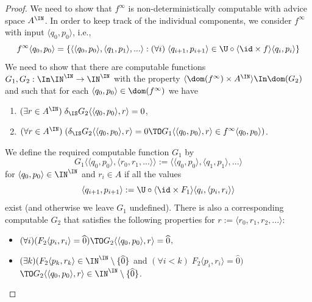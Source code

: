 \begin{proof}
We need to show that $f^\infty$ is non-deterministically computable with advice space $A^\IN$.
In order to keep track of the individual components, we consider $f^\infty$ with input $\langle q_0,p_0\rangle$, i.e.,
\[f^\infty\langle q_0,p_0\rangle=\{\langle\langle q_0,p_0\rangle,\langle q_1,p_1\rangle,...\rangle:
(\forall i)\;\langle q_{i+1},p_{i+1}\rangle\in\U\circ\langle\id\times f\rangle\langle q_i,p_i\rangle\}\]
We need to show that there are computable functions $G_1,G_2:\In\IN^\IN\to\IN^\IN$ 
with the property
$\langle \dom(f^\infty)\times A^\IN\rangle\In\dom(G_2)$ and such that for each $\langle q_0,p_0\rangle\in\dom(f^\infty)$ we have
\begin{enumerate}
\item $(\exists r\in A^\IN)\;\delta_\IS G_2\langle\langle q_0,p_0\rangle,r\rangle=0$,
\item $(\forall r\in A^\IN)\;(\delta_\IS G_2\langle \langle q_0,p_0\rangle,r\rangle=0\TO G_1\langle \langle q_0,p_0\rangle,r\rangle\in f^\infty\langle q_0,p_0\rangle)$.
\end{enumerate}
We define the required computable function $G_1$ by
\[G_1\langle\langle q_0,p_0\rangle,\langle r_0,r_1,...\rangle\rangle:=\langle\langle q_0,p_0\rangle,\langle q_1,p_1\rangle,...\rangle\]
for $\langle q_0,p_0\rangle\in\IN^\IN$ and $r_i\in A$ if all the values
\[\langle q_{i+1},p_{i+1}\rangle:=\U\circ\langle\id\times F_1\rangle\langle q_i,\langle p_i,r_i\rangle\rangle\]
exist (and otherwise we leave $G_1$ undefined). There is also a corresponding computable $G_2$ that satisfies
the following properties for $r:=\langle r_0,r_1,r_2,...\rangle$:
\begin{itemize}
\item $(\forall i)(F_2\langle p_i,r_i\rangle=\widehat{0})\TO G_2\langle\langle q_0,p_0\rangle,r\rangle=\widehat{0}$,
\item $(\exists k)(F_2\langle p_k,r_k\rangle\in\IN^\IN\setminus\{\widehat{0}\}$ and $(\forall i<k)\;F_2\langle p_i,r_i\rangle=\widehat{0})$\\ $\TO G_2\langle\langle q_0,p_0\rangle,r\rangle\in\IN^\IN\setminus\{\widehat{0}\}$.
\end{itemize}


\end{proof}
